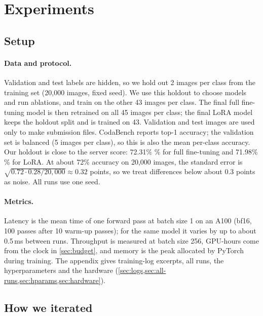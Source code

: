 \section{Experiments}
\label{sec:experiments}

\subsection{Setup}
\label{sec:setup}

\paragraph{Data and protocol.}
Validation and test labels are hidden, so we hold out 2 images per class from the training set (20,000 images, fixed seed).
We use this holdout to choose models and run ablations, and train on the other 43 images per class.
The final full fine-tuning model is then retrained on all 45 images per class; the final LoRA model keeps the holdout split and is trained on 43.
Validation and test images are used only to make submission files.
CodaBench reports top-1 accuracy; the validation set is balanced (5 images per class), so this is also the mean per-class accuracy.
Our holdout is close to the server score: 72.31\% \% for full fine-tuning and 71.98\% \% for LoRA.
At about 72\% accuracy on 20,000 images, the standard error is $\sqrt{0.72 \cdot 0.28 / 20{,}000} \approx 0.32$ points, so we treat differences below about 0.3 points as noise.
All runs use one seed.

\paragraph{Metrics.}
Latency is the mean time of one forward pass at batch size 1 on an A100 (bf16, 100 passes after 10 warm-up passes); for the same model it varies by up to about 0.5\,ms between runs.
Throughput is measured at batch size 256, GPU-hours come from the clock in \cref{sec:budget}, and memory is the peak allocated by PyTorch during training.
The appendix gives training-log excerpts, all runs, the hyperparameters and the hardware (\cref{sec:logs,sec:all-runs,sec:hparams,sec:hardware}).

\subsection{How we iterated}
\label{sec:process}

